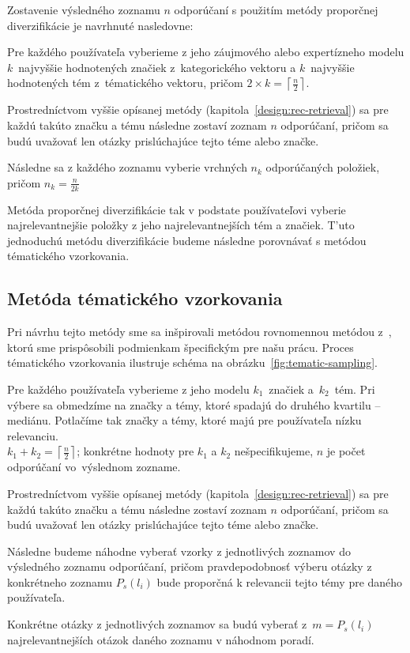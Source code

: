 Zostavenie výsledného zoznamu $n$ odporúčaní s použitím metódy proporčnej diverzifikácie je navrhnuté nasledovne:

\begin{my_enumerate}
\item{
    Pre každého používateľa vyberieme z jeho záujmového alebo expertízneho modelu $k$~najvyššie hodnotených značiek
    z~kategorického vektoru a $k$~najvyššie hodnotených tém z~tématického vektoru, pričom
    $2 \times k = \left\lceil\frac{n}{2}\right\rceil$.
}
\item{
    Prostredníctvom vyššie opísanej metódy (kapitola~\ref{design:rec-retrieval}) sa pre každú takúto značku a tému
    následne zostaví zoznam $n$ odporúčaní, pričom sa budú uvažovať len otázky prislúchajúce tejto téme alebo značke.
}
\item{
    Následne sa z každého zoznamu vyberie vrchných $n_k$ odporúčaných položiek, pričom $n_k = \frac{n}{2k}$
}
\end{my_enumerate}

Metóda proporčnej diverzifikácie tak v podstate používateľovi vyberie najrelevantnejšie položky z jeho najrelevantnejších
tém a značiek. T'uto jednoduchú metódu diverzifikácie budeme následne porovnávať s metódou tématického vzorkovania.


\subsection{Metóda tématického vzorkovania}

Pri návrhu tejto metódy sme sa inšpirovali metódou rovnomennou metódou z~\cite{Szpektor2013}, ktorú sme prispôsobili
podmienkam špecifickým pre našu prácu. Proces tématického vzorkovania ilustruje schéma na obrázku~\ref{fig:tematic-sampling}.

\begin{my_enumerate}
\item{
    Pre každého používateľa vyberieme z jeho modelu $k_1$~značiek a~$k_2$~tém. Pri výbere sa obmedzíme na značky a témy,
    ktoré spadajú do druhého kvartilu -- mediánu. Potlačíme tak značky a témy, ktoré majú pre používateľa nízku relevanciu.\\
    $k_1 + k_2 = \left\lceil\frac{n}{2}\right\rceil$; konkrétne hodnoty pre $k_1$ a $k_2$ nešpecifikujeme, $n$ je počet
    odporúčaní vo~výslednom zozname.
}
\item{
    Prostredníctvom vyššie opísanej metódy (kapitola~\ref{design:rec-retrieval}) sa pre každú takúto značku a tému
    následne zostaví zoznam $n$ odporúčaní, pričom sa budú uvažovať len otázky prislúchajúce tejto téme alebo značke.
}
\item{
    Následne budeme náhodne vyberať vzorky z jednotlivých zoznamov do výsledného zoznamu odporúčaní, pričom pravdepodobnosť
    výberu otázky z konkrétneho zoznamu $P_s(l_i)$ bude proporčná k relevancii tejto témy pre daného používateľa.
}
\item{
    Konkrétne otázky z jednotlivých zoznamov sa budú vyberať z~$m = P_s(l_i)$ najrelevantnejších otázok daného zoznamu
    v náhodnom poradí.

}
\end{my_enumerate}

